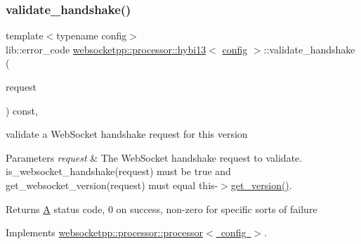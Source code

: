 \subsubsection{\texorpdfstring{validate\+\_\+handshake()}{validate\_handshake()}}
{\footnotesize\ttfamily template$<$typename config$>$ \\
lib\+::error\+\_\+code \mbox{\hyperlink{classwebsocketpp_1_1processor_1_1hybi13}{websocketpp\+::processor\+::hybi13}}$<$ \mbox{\hyperlink{classconfig}{config}} $>$\+::validate\+\_\+handshake (\begin{DoxyParamCaption}\item[{\mbox{\hyperlink{classwebsocketpp_1_1http_1_1parser_1_1request}{request\+\_\+type}} const \&}]{request }\end{DoxyParamCaption}) const\hspace{0.3cm}{\ttfamily [inline]}, {\ttfamily [virtual]}}



validate a Web\+Socket handshake request for this version 


\begin{DoxyParams}{Parameters}
{\em request} & The Web\+Socket handshake request to validate. is\+\_\+websocket\+\_\+handshake(request) must be true and get\+\_\+websocket\+\_\+version(request) must equal this-\/$>$\mbox{\hyperlink{classwebsocketpp_1_1processor_1_1hybi13_afe89fa6418643711130ce3417451738b}{get\+\_\+version()}}.\\
\hline
\end{DoxyParams}
\begin{DoxyReturn}{Returns}
\mbox{\hyperlink{struct_a}{A}} status code, 0 on success, non-\/zero for specific sorts of failure 
\end{DoxyReturn}


Implements \mbox{\hyperlink{classwebsocketpp_1_1processor_1_1processor_a8828f7d91c534309deb966b783eb1f8e}{websocketpp\+::processor\+::processor$<$ config $>$}}.

\mbox{\label{classwebsocketpp_1_1processor_1_1hybi13_a0c549a5e2766288fb625c03e507cc9ad}} 
